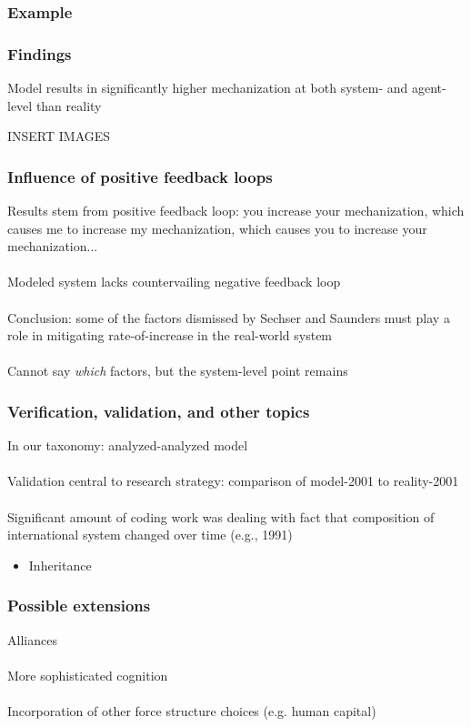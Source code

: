 \documentclass{beamer}
\begin{document}
\begin{frame}
	\frametitle{Example}
\end{frame}

\begin{frame}
	\frametitle{Findings}

	Model results in significantly higher mechanization at both system- and
	agent-level than reality

	INSERT IMAGES
\end{frame}

\begin{frame}
	\frametitle{Influence of positive feedback loops}

	Results stem from positive feedback loop: you increase your
	mechanization, which causes me to increase my mechanization, which
	causes you to increase your mechanization... \\~\\

	Modeled system lacks countervailing negative feedback loop \\~\\

	Conclusion: some of the factors dismissed by Sechser and Saunders must
	play a role in mitigating rate-of-increase in the real-world system
	\\~\\

	Cannot say \textit{which} factors, but the system-level point remains

\end{frame}

\begin{frame}
	\frametitle{Verification, validation, and other topics}

	In our taxonomy: analyzed-analyzed model \\~\\

	Validation central to research strategy: comparison of model-2001 to
	reality-2001 \\~\\

	Significant amount of coding work was dealing with fact that composition
	of international system changed over time (e.g., 1991)

	\begin{itemize}
		\item \small Inheritance
	\end{itemize}
\end{frame}

\begin{frame}
	\frametitle{Possible extensions}

	Alliances \\~\\

	More sophisticated cognition \\~\\

	Incorporation of other force structure choices (e.g. human capital) \\~\\
\end{frame}
\end{document}
